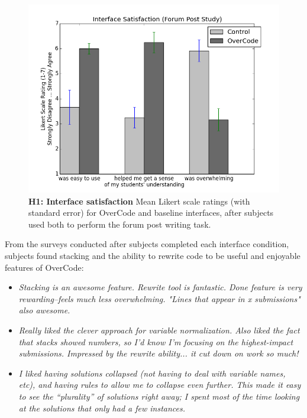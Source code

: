 \documentclass[12pt,twoside]{mitthesis}
\begin{document}
\begin{figure}
\centering
\includegraphics[scale=0.5]{Body/figures/overcode/study1Likert.png}
\caption{{\bf H1: Interface satisfaction} Mean Likert scale ratings (with standard error) for OverCode and baseline interfaces, after subjects used both to perform the forum post writing task.}
\label{study1Likert}
\end{figure}


From the surveys conducted after subjects completed each interface condition, subjects found stacking and the ability to rewrite code to be useful and enjoyable features of OverCode:
 \begin{itemize} 
\item {\it Stacking is an awesome feature. Rewrite tool is fantastic. Done feature is very rewarding--feels much less overwhelming. "Lines that appear in x submissions" also awesome.}

\item {\it Really liked the clever approach for variable normalization. Also liked the fact that stacks showed numbers, so I'd know I'm focusing on the highest-impact submissions. Impressed by the rewrite ability... it cut down on work so much!}

\item {\it I liked having solutions collapsed (not having to deal with variable names, etc), and having rules to allow me to collapse even further. This made it easy to see the ``plurality'' of solutions right away; I spent most of the time looking at the solutions that only had a few instances.}
 \end{itemize} 
\end{document}

